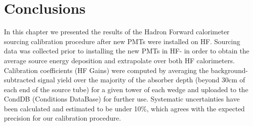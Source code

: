 \section{Conclusions}
In this chapter we presented the results of the Hadron Forward calorimeter sourcing calibration procedure after new PMTs were installed on HF. Sourcing data was collected prior to installing the new PMTs in HF- in order to obtain the average source energy deposition and extrapolate over both HF calorimeters. Calibration coefficients (HF Gains) were computed by averaging the background-subtracted signal yield over the majority of the absorber depth (beyond 30cm of each end of the source tube) for a given tower of each wedge and uploaded to the CondDB (Conditions DataBase) for further use. Systematic uncertainties have been calculated and estimated to be under 10\%, which agrees with the expected precision for our calibration procedure.